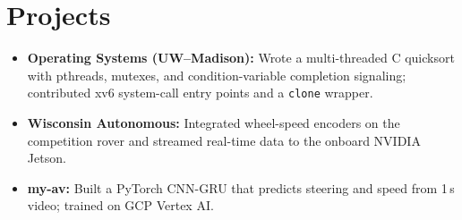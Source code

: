 \documentclass[11pt, letterpaper]{article}
\begin{document}
\section{Projects}
\begin{itemize}
  \item \textbf{Operating Systems (UW--Madison):} Wrote a multi-threaded C quicksort with pthreads, mutexes, and condition-variable completion signaling; contributed xv6 system-call entry points and a \texttt{clone} wrapper.
  \item \textbf{Wisconsin Autonomous:} Integrated wheel-speed encoders on the competition rover and streamed real-time data to the onboard NVIDIA Jetson.
  \item \textbf{my-av:} Built a PyTorch CNN-GRU that predicts steering and speed from 1\,s video; trained on GCP Vertex AI.
\end{itemize}
\end{document}

